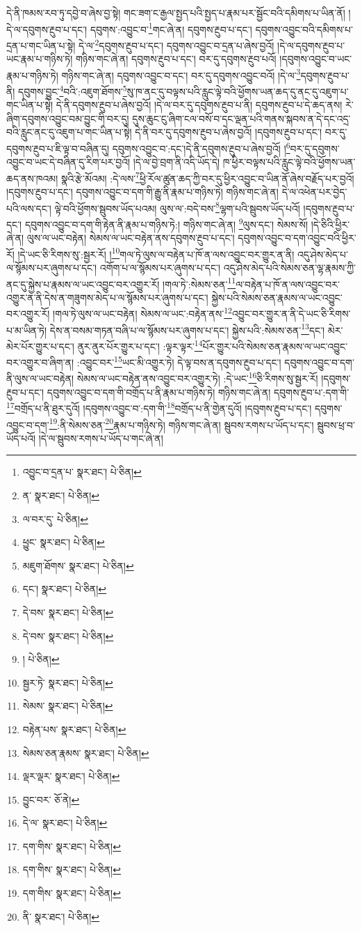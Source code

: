 དེ་ནི་ཁམས་རབ་ཏུ་དབྱེ་བ་ཞེས་བྱ་སྟེ། གང་ཟག་ང་རྒྱལ་སྤྱད་པའི་སྤྱད་པ་རྣམ་པར་སྦྱོང་བའི་དམིགས་པ་ཡིན་ནོ། །དེ་ལ་དབུགས་རྔུབ་པ་དང་། དབུགས་:འབྱུང་བ་\footnote{འབྱུང་བ་དྲན་པ་  སྣར་ཐང་།  པེ་ཅིན། }གང་ཞེ་ན། དབུགས་རྔུབ་པ་དང་། དབུགས་འབྱུང་བའི་དམིགས་པ་དྲན་པ་གང་ཡིན་པ་སྟེ། དེ་ལ་\footnote{ན་  སྣར་ཐང་།  པེ་ཅིན། }དབུགས་རྔུབ་པ་དང་། དབུགས་འབྱུང་བ་དྲན་པ་ཞེས་བྱའོ། །དེ་ལ་དབུགས་རྔུབ་པ་ཡང་རྣམ་པ་གཉིས་ཏེ། གཉིས་གང་ཞེ་ན། དབུགས་རྔུབ་པ་དང་། བར་དུ་དབུགས་རྔུབ་པའོ། །དབུགས་འབྱུང་བ་ཡང་རྣམ་པ་གཉིས་ཏེ། གཉིས་གང་ཞེ་ན། དབུགས་འབྱུང་བ་དང་། བར་དུ་དབུགས་འབྱུང་བའོ། །དེ་ལ་\footnote{ལ་བར་དུ་  པེ་ཅིན། }དབུགས་རྔུབ་པ་ནི། དབུགས་བྱུང་\footnote{ཕྱུང་  སྣར་ཐང་།  པེ་ཅིན། }བའི་:འཇུག་ཐོགས་\footnote{མཇུག་ཐོགས་  སྣར་ཐང་།  པེ་ཅིན། }སུ་ཁ་ནང་དུ་བལྟས་པའི་རླུང་ལྟེ་བའི་ཕྱོགས་ཡན་ཆད་དུ་ནང་དུ་འཇུག་པ་གང་ཡིན་པ་སྟེ། དེ་ནི་དབུགས་རྔུབ་པ་ཞེས་བྱའོ། །དེ་ལ་བར་དུ་དབུགས་རྔུབ་པ་ནི། དབུགས་རྔུབ་པ་དེ་ཆད་ནས། རེ་ཞིག་དབུགས་འབྱུང་བམ་བྱུང་གི་བར་དུ། དུས་ཆུང་ངུ་ཞིག་ངལ་བསོ་བ་དང་ལྡན་པའི་གནས་སྐབས་ན་དེ་དང་འདྲ་བའི་རླུང་ནང་དུ་འཇུག་པ་གང་ཡིན་པ་སྟེ། དེ་ནི་བར་དུ་དབུགས་རྔུབ་པ་ཞེས་བྱའོ། །དབུགས་རྔུབ་པ་དང་། བར་དུ་དབུགས་རྔུབ་པ་ཇི་ལྟ་བ་བཞིན་དུ། དབུགས་འབྱུང་བ་:དང་།དེ་ནི་དབུགས་རྔུབ་པ་ཞེས་བྱའོ། །\footnote{དང་།  སྣར་ཐང་།  པེ་ཅིན། }བར་དུ་དབུགས་འབྱུང་བ་ཡང་དེ་བཞིན་དུ་རིག་པར་བྱའོ། །དེ་ལ་བྱེ་བྲག་ནི་འདི་ཡོད་དེ། ཁ་ཕྱིར་བལྟས་པའི་རླུང་ལྟེ་བའི་ཕྱོགས་ཡན་ཆད་ནས་ཁའམ། སྣའི་རྩེ་མོའམ། :དེ་ལས་\footnote{དེ་བས་  སྣར་ཐང་།  པེ་ཅིན། }ཕྱི་རོལ་ཚུན་ཆད་ཀྱི་བར་དུ་ཕྱིར་འབྱུང་བ་ཡིན་ནོ་ཞེས་བརྗོད་པར་བྱའོ། །དབུགས་རྔུབ་པ་དང་། དབུགས་འབྱུང་བ་དག་གི་རྒྱུ་ནི་རྣམ་པ་གཉིས་ཏེ། གཉིས་གང་ཞེ་ན། དེ་ལ་འཕེན་པར་བྱེད་པའི་ལས་དང་། ལྟེ་བའི་ཕྱོགས་སྦུབས་ཡོད་པའམ། ལུས་ལ་:བདེ་བས་\footnote{དེ་བས་  སྣར་ཐང་།  པེ་ཅིན། }ལྷག་པའི་སྦུབས་ཡོད་པའོ། །དབུགས་རྔུབ་པ་དང་། དབུགས་འབྱུང་བ་དག་གི་རྟེན་ནི་རྣམ་པ་གཉིས་ཏེ:། གཉིས་གང་ཞེ་ན། \footnote{།    པེ་ཅིན། }ལུས་དང་། སེམས་སོ། །དེ་ཅིའི་ཕྱིར་ཞེ་ན། ལུས་ལ་ཡང་བརྟེན། སེམས་ལ་ཡང་བརྟེན་ནས་དབུགས་རྔུབ་པ་དང་། དབུགས་འབྱུང་བ་དག་འབྱུང་བའི་ཕྱིར་རོ། །དེ་ཡང་ཅི་རིགས་སུ་:སྦྱར་རོ། །\footnote{སྦྱར་ཏེ་  སྣར་ཐང་།  པེ་ཅིན། }གལ་ཏེ་ལུས་ལ་བརྟེན་པ་ཁོ་ན་ལས་འབྱུང་བར་གྱུར་ན་ནི། འདུ་ཤེས་མེད་པ་ལ་སྙོམས་པར་ཞུགས་པ་དང་། འགོག་པ་ལ་སྙོམས་པར་ཞུགས་པ་དང་། འདུ་ཤེས་མེད་པའི་སེམས་ཅན་ལྷ་རྣམས་ཀྱི་ནང་དུ་སྐྱེས་པ་རྣམས་ལ་ཡང་འབྱུང་བར་འགྱུར་རོ། །གལ་ཏེ་:སེམས་ཅན་\footnote{སེམས་  སྣར་ཐང་།  པེ་ཅིན། }ལ་བརྟེན་པ་ཁོ་ན་ལས་འབྱུང་བར་འགྱུར་ན་ནི་དེས་ན་གཟུགས་མེད་པ་ལ་སྙོམས་པར་ཞུགས་པ་དང་། སྐྱེས་པའི་སེམས་ཅན་རྣམས་ལ་ཡང་འབྱུང་བར་འགྱུར་རོ། །གལ་ཏེ་ལུས་ལ་ཡང་བརྟེན། སེམས་ལ་ཡང་:བརྟེན་ནས་\footnote{བརྟེན་པས་  སྣར་ཐང་།  པེ་ཅིན། }འབྱུང་བར་གྱུར་ན་ནི་དེ་ཡང་ཅི་རིགས་པ་མ་ཡིན་ཏེ། དེས་ན་བསམ་གཏན་བཞི་པ་ལ་སྙོམས་པར་ཞུགས་པ་དང་། སྐྱེས་པའི་:སེམས་ཅན་\footnote{སེམས་ཅན་རྣམས་  སྣར་ཐང་།  པེ་ཅིན། }དང་། མེར་མེར་པོར་གྱུར་པ་དང་། ནུར་ནུར་པོར་གྱུར་པ་དང་། :ལྟར་ལྟར་\footnote{ལྡར་ལྡར་  སྣར་ཐང་།  པེ་ཅིན། }པོར་གྱུར་པའི་སེམས་ཅན་རྣམས་ལ་ཡང་འབྱུང་བར་འགྱུར་བ་ཞིག་ན། :འབྱུང་བར་\footnote{བྱུང་བར་  ཅོ་ནེ། }ཡང་མི་འགྱུར་ཏེ། དེ་ལྟ་བས་ན་དབུགས་རྔུབ་པ་དང་། དབུགས་འབྱུང་བ་དག་ནི་ལུས་ལ་ཡང་བརྟེན། སེམས་ལ་ཡང་བརྟེན་ནས་འབྱུང་བར་འགྱུར་ཏེ། :དེ་ཡང་\footnote{དེ་ལ་  སྣར་ཐང་།  པེ་ཅིན། }ཅི་རིགས་སུ་སྦྱར་རོ། །དབུགས་རྔུབ་པ་དང་། དབུགས་འབྱུང་བ་དག་གི་བགྲོད་པ་ནི་རྣམ་པ་གཉིས་ཏེ། གཉིས་གང་ཞེ་ན། དབུགས་རྔུབ་པ་:དག་གི་\footnote{དག་གིས་  སྣར་ཐང་།  པེ་ཅིན། }བགྲོད་པ་ནི་ཐུར་དུའོ། །དབུགས་འབྱུང་བ་:དག་གི་\footnote{དག་གིས་  སྣར་ཐང་།  པེ་ཅིན། }བགྲོད་པ་ནི་གྱེན་དུའོ། །དབུགས་རྔུབ་པ་དང་། དབུགས་འབྱུང་བ་དག་\footnote{དག་གིས་  སྣར་ཐང་།  པེ་ཅིན། }:ནི་སེམས་ཅན་\footnote{ནི་  སྣར་ཐང་།  པེ་ཅིན། }རྣམ་པ་གཉིས་ཏེ། གཉིས་གང་ཞེ་ན། སྦུབས་རགས་པ་ཡོད་པ་དང་། སྦུབས་ཕྲ་བ་ཡོད་པའོ། །དེ་ལ་སྦུབས་རགས་པ་ཡོད་པ་གང་ཞེ་ན། 